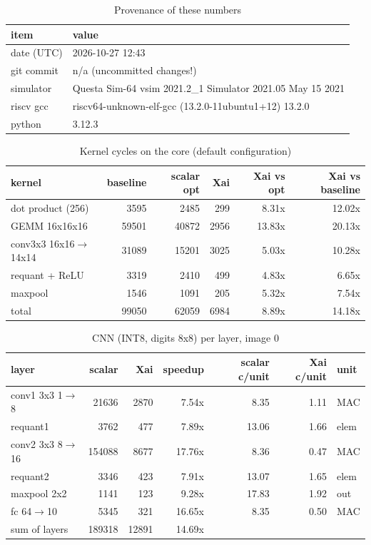 \begin{table}[t]
\centering
\caption{Provenance of these numbers}
\label{tab:provenance}
\begin{tabular}{ll}
\toprule
item & value \\
\midrule
date (UTC) & 2026-10-27 12:43 \\
git commit & n/a (uncommitted changes!) \\
simulator & Questa Sim-64 vsim 2021.2\_1 Simulator 2021.05 May 15 2021 \\
riscv gcc & riscv64-unknown-elf-gcc (13.2.0-11ubuntu1+12) 13.2.0 \\
python & 3.12.3 \\
\bottomrule
\end{tabular}
\end{table}

\begin{table}[t]
\centering
\caption{Kernel cycles on the core (default configuration)}
\label{tab:kernels}
\begin{tabular}{lrrrrr}
\toprule
kernel & baseline & scalar opt & Xai & Xai vs opt & Xai vs baseline \\
\midrule
dot product (256) & 3595 & 2485 & 299 & 8.31x & 12.02x \\
GEMM 16x16x16 & 59501 & 40872 & 2956 & 13.83x & 20.13x \\
conv3x3 16x16$\to$14x14 & 31089 & 15201 & 3025 & 5.03x & 10.28x \\
requant + ReLU & 3319 & 2410 & 499 & 4.83x & 6.65x \\
maxpool & 1546 & 1091 & 205 & 5.32x & 7.54x \\
total & 99050 & 62059 & 6984 & 8.89x & 14.18x \\
\bottomrule
\end{tabular}
\end{table}

\begin{table}[t]
\centering
\caption{CNN (INT8, digits 8x8) per layer, image 0}
\label{tab:cnn_layers}
\begin{tabular}{lrrrrrl}
\toprule
layer & scalar & Xai & speedup & scalar c/unit & Xai c/unit & unit \\
\midrule
conv1 3x3 1$\to$8 & 21636 & 2870 & 7.54x & 8.35 & 1.11 & MAC \\
requant1 & 3762 & 477 & 7.89x & 13.06 & 1.66 & elem \\
conv2 3x3 8$\to$16 & 154088 & 8677 & 17.76x & 8.36 & 0.47 & MAC \\
requant2 & 3346 & 423 & 7.91x & 13.07 & 1.65 & elem \\
maxpool 2x2 & 1141 & 123 & 9.28x & 17.83 & 1.92 & out \\
fc 64$\to$10 & 5345 & 321 & 16.65x & 8.35 & 0.50 & MAC \\
sum of layers & 189318 & 12891 & 14.69x &  &  &  \\
\bottomrule
\end{tabular}
\end{table}

